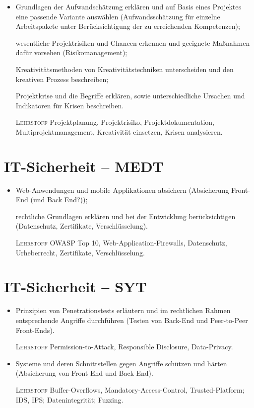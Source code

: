 \begin{itemize}[label={-}]
    \item Grundlagen der Aufwandschätzung erklären und auf Basis eines Projektes eine passende Variante auswählen
        {\color{red}(Aufwandsschätzung für einzelne Arbeitspakete unter Berücksichtigung der zu erreichenden Kompetenzen)};
    \item[] wesentliche Projektrisiken und Chancen erkennen und geeignete Maßnahmen dafür vorsehen
        {\color{red}(Risikomanagement)};
    \item[] Kreativitätsmethoden von Kreativitätstechniken unterscheiden und den kreativen Prozess beschreiben;
    \item[] Projektkrise und die Begriffe erklären, sowie unterschiedliche Ursachen und Indikatoren für Krisen beschreiben.
    \item[\tiny\textsc{Lehrstoff}] Projektplanung, Projektrisiko, Projektdokumentation, Multiprojektmanagement, Kreativität einsetzen, Krisen analysieren.
\end{itemize}


\section{IT-Sicherheit -- MEDT}

\begin{itemize}[label={-}]
    \item Web-Anwendungen und mobile Applikationen absichern
        {\color{red}(Absicherung Front-End (und Back End?))};
    \item[] rechtliche Grundlagen erklären und bei der Entwicklung berücksichtigen
        {\color{red}(Datenschutz, Zertifikate, Verschlüsselung)}.
    \item[\tiny\textsc{Lehrstoff}] OWASP Top 10, Web-Application-Firewalls, Datenschutz, Urheberrecht, Zertifikate, Verschlüsselung.
\end{itemize}


\section{IT-Sicherheit -- SYT}

\begin{itemize}[label={-}]
    \item Prinzipien von Penetrationstests erläutern und im rechtlichen Rahmen entsprechende Angriffe durchführen
        {\color{red}(Testen von Back-End und Peer-to-Peer Front-Ends)}.
    \item[\tiny\textsc{Lehrstoff}] Permission-to-Attack, Responsible Disclosure, Data-Privacy.\lehrstoffrule
 
    \item Systeme und deren Schnittstellen gegen Angriffe schützen und härten
        {\color{red}(Absicherung von Front End und Back End)}.
    \item[\tiny\textsc{Lehrstoff}] Buffer-Overflows, Mandatory-Access-Control, Trusted-Platform; IDS, IPS; Datenintegrität; Fuzzing.
\end{itemize}


